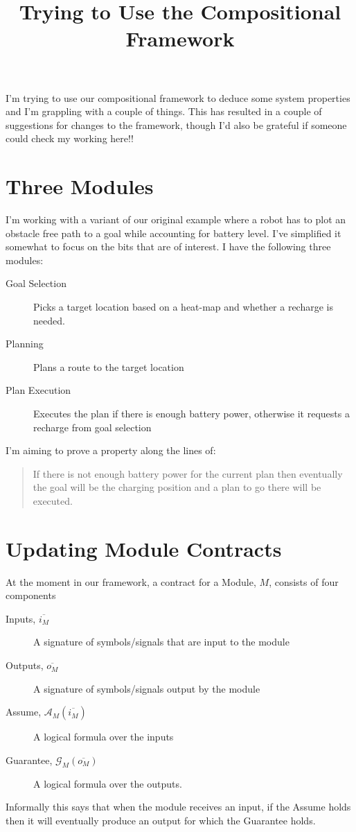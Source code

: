 \documentclass{blue-book}
\title{Trying to Use the Compositional Framework}
\begin{document}
\maketitle
I'm trying to use our compositional framework to deduce some system properties and I'm grappling with a couple of things.  This has resulted in a couple of suggestions for changes to the framework, though I'd also be grateful if someone could check my working here!!

\section{Three Modules}
I'm working with a variant of our original example where a robot has to plot an obstacle free path to a goal while accounting for battery level.   I've simplified it somewhat to focus on the bits that are of interest.  I have the following three modules:

\begin{description}
\item[Goal Selection] Picks a target location based on a heat-map and whether a recharge is needed.
\item[Planning] Plans a route to the target location
\item[Plan Execution] Executes the plan if there is enough battery power, otherwise it requests a recharge from goal selection
\end{description}

I'm aiming to prove a property along the lines of:
\begin{quote}
If there is not enough battery power for the current plan then eventually the goal will be the charging position and a plan to go there will be executed.
\end{quote}

\section{Updating Module Contracts}

At the moment in our framework, a contract for a Module, $M$, consists of four components
\begin{description}
\item[Inputs, $\overline{i_M}$] A signature of symbols/signals that are input to the module
\item[Outputs, $\overline{o_M}$] A signature of symbols/signals output by the module
\item[Assume, $\mathcal{A}_M(\overline{i_M})$] A logical formula over the inputs
\item[Guarantee, $\mathcal{G}_M(\overline{o_M})$] A logical formula over the outputs.
\end{description}
Informally this says that when the module receives an input, if the Assume holds then it will eventually produce an output for which the Guarantee holds.
\end{document}
